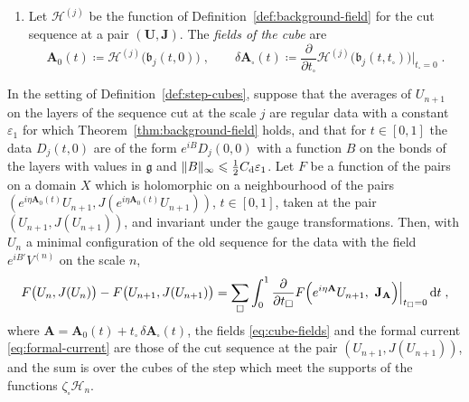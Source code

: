 \documentclass[11pt]{preprint}
\newcommand{\dd}{\mathrm{d}}
\DeclarePairedDelimiter{\norm}{\lVert}{\rVert}
\numberwithin{equation}{section}
\begin{document}
\begin{definition}
\begin{enumerate}[label=(\roman*)]
\item Let $\mathcal H^{(j)}$ be the function of Definition~\ref{def:background-field} for the cut sequence at a pair $(\mathbf U, \mathbf J)$. The \emph{fields of the cube} are
\begin{equation}\label{eq:cube-fields}
    \mathbf A_0(t) \coloneqq \mathcal H^{(j)}\bigl(\mathfrak b_j(t, 0)\bigr)\;,
    \qquad
    \delta\mathbf A_\square(t) \coloneqq \frac{\partial}{\partial t_\square}\mathcal H^{(j)}\bigl(\mathfrak b_j(t, t_\square)\bigr)\Big|_{t_\square = 0}\;.
\end{equation}
\end{enumerate}
\end{definition}

\begin{lemma}\label{lem:cube-division}
In the setting of Definition~\ref{def:step-cubes}, suppose that the averages of $U_{n+1}$ on the layers of the sequence cut at the scale $j$ are regular data with a constant $\varepsilon_1$ for which Theorem~\ref{thm:background-field} holds, and that for $t \in [0, 1]$ the data $D_j(t, 0)$ are of the form $e^{iB}D_j(0, 0)$ with a function $B$ on the bonds of the layers with values in $\mathfrak g$ and $\norm B_\infty \leqslant \frac{1}{2}C_{\mathrm d}\varepsilon_1$. Let $F$ be a function of the pairs on a domain $X$ which is holomorphic on a neighbourhood of the pairs $(e^{i\eta\mathbf A_0(t)}U_{n+1}, J(e^{i\eta\mathbf A_0(t)}U_{n+1}))$, $t \in [0, 1]$, taken at the pair $(U_{n+1}, J(U_{n+1}))$, and invariant under the gauge transformations. Then, with $U_n$ a minimal configuration of the old sequence for the data with the field $e^{iB'}V^{(n)}$ on the scale $n$,
\begin{equation}\label{eq:cube-division}
    F\bigl(U_n, J(U_n)\bigr) - F\bigl(U_{n+1}, J(U_{n+1})\bigr) = \sum_\square\int_0^1\frac{\partial}{\partial t_\square}F\Bigl(e^{i\eta\mathbf A}U_{n+1},\ \mathbf J_{\mathbf A}\Bigr)\Big|_{t_\square = 0}\,\dd t\;,
\end{equation}
where $\mathbf A = \mathbf A_0(t) + t_\square\,\delta\mathbf A_\square(t)$, the fields \eqref{eq:cube-fields} and the formal current \eqref{eq:formal-current} are those of the cut sequence at the pair $(U_{n+1}, J(U_{n+1}))$, and the sum is over the cubes of the step which meet the supports of the functions $\zeta_\square\mathcal H_n$.
\end{lemma}
\end{document}
